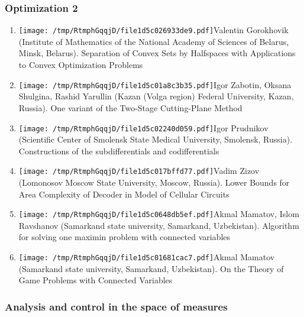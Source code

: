\documentclass[
]{article}
\providecommand{\tightlist}{%
  \setlength{\itemsep}{0pt}\setlength{\parskip}{0pt}}
\begin{document}
\hypertarget{o2}{%
\subsubsection{Optimization 2}\label{o2}}

\begin{enumerate}
\def\labelenumi{\arabic{enumi}.}
\tightlist
\item
  \protect\texttt{[image: /tmp/RtmphGqqjD/file1d5c026933de9.pdf]}Valentin
  Gorokhovik (Institute of Mathematics of the National Academy of
  Sciences of Belarus, Minsk, Belarus). Separation of Convex Sets by
  Halfspaces with Applications to Convex Optimization Problems
\item
  \protect\texttt{[image: /tmp/RtmphGqqjD/file1d5c01a8c3b35.pdf]}Igor
  Zabotin, Oksana Shulgina, Rashid Yarullin (Kazan (Volga region)
  Federal University, Kazan, Russia). One variant of the Two-Stage
  Cutting-Plane Method
\item
  \protect\texttt{[image: /tmp/RtmphGqqjD/file1d5c02240d059.pdf]}Igor
  Prudnikov (Scientific Center of Smolensk State Medical University,
  Smolensk, Russia). Constructions of the subdifferentials and
  codifferentials
\item
  \protect\texttt{[image: /tmp/RtmphGqqjD/file1d5c017bffd77.pdf]}Vadim
  Zizov (Lomonosov Moscow State University, Moscow, Russia). Lower
  Bounds for Area Complexity of Decoder in Model of Cellular Circuits
\item
  \protect\texttt{[image: /tmp/RtmphGqqjD/file1d5c0648db5ef.pdf]}Akmal
  Mamatov, Islom Ravshanov (Samarkand state university, Samarkand,
  Uzbekistan). Algorithm for solving one maximin problem with connected
  variables
\item
  \protect\texttt{[image: /tmp/RtmphGqqjD/file1d5c01681cac7.pdf]}Akmal
  Mamatov (Samarkand state university, Samarkand, Uzbekistan). On the
  Theory of Game Problems with Connected Variables
\end{enumerate}

\hypertarget{meas}{%
\subsubsection{Analysis and control in the space of
measures}\label{meas}}
\end{document}
